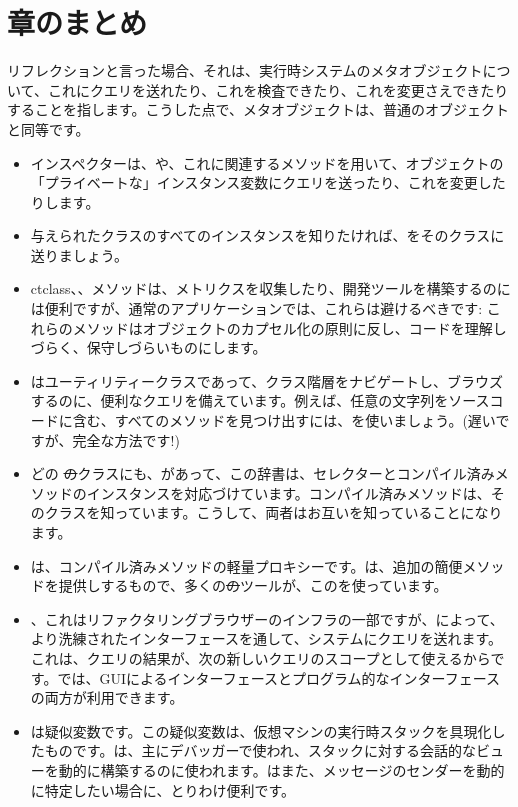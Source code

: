 \documentclass[a4paper,10pt,twoside]{book}
\begin{document}
\section{章のまとめ}

リフレクションと言った場合、それは、実行時システムのメタオブジェクトについて、これにクエリを送れたり、これを検査できたり、これを変更さえできたりすることを指します。こうした点で、メタオブジェクトは、普通のオブジェクトと同等です。

\begin{itemize}
\item インスペクターは、や、これに関連するメソッドを用いて、オブジェクトの「プライベートな」インスタンス変数にクエリを送ったり、これを変更したりします。
\item 与えられたクラスのすべてのインスタンスを知りたければ、をそのクラスに送りましょう。
\item ct{class}、、\etc メソッドは、メトリクスを収集したり、開発ツールを構築するのには便利ですが、通常のアプリケーションでは、これらは避けるべきです: これらのメソッドはオブジェクトのカプセル化の原則に反し、コードを理解しづらく、保守しづらいものにします。
\item {}はユーティリティークラスであって、クラス階層をナビゲートし、ブラウズするのに、便利なクエリを備えています。例えば、任意の文字列をソースコードに含む、すべてのメソッドを見つけ出すには、を使いましょう。(遅いですが、完全な方法です!)
\item どの \st のクラスにも、があって、この辞書は、セレクターとコンパイル済みメソッドのインスタンスを対応づけています。コンパイル済みメソッドは、そのクラスを知っています。こうして、両者はお互いを知っていることになります。
\item {}は、コンパイル済みメソッドの軽量プロキシーです。は、追加の簡便メソッドを提供しするもので、多くの\st のツールが、このを使っています。
\item {}、これはリファクタリングブラウザーのインフラの一部ですが、によって、より洗練されたインターフェースを通して、システムにクエリを送れます。これは、クエリの結果が、次の新しいクエリのスコープとして使えるからです。では、GUIによるインターフェースとプログラム的なインターフェースの両方が利用できます。
\item {}は疑似変数です。この疑似変数は、仮想マシンの実行時スタックを具現化したものです。は、主にデバッガーで使われ、スタックに対する会話的なビューを動的に構築するのに使われます。はまた、メッセージのセンダーを動的に特定したい場合に、とりわけ便利です。 %

\end{itemize}
\end{document}
